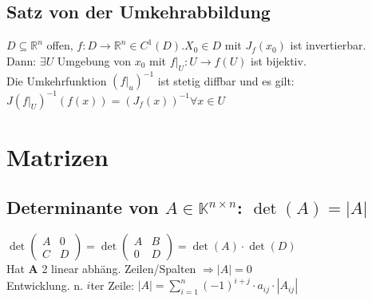 \documentclass[6pt,a4paper]{scrartcl}
\newcommand{\ma}[1]{\ensuremath{\boldsymbol {#1}}}												%
\newcommand{\ra}[0]{\ensuremath{\rightarrow}} 									%
\newcommand{\C}{\ensuremath{\mathbb C}}
\begin{document}
\begin{multicols*}{4}
\subsection{Satz von der Umkehrabbildung}

$D \subseteq \mathbb R^n$ offen, $f: D \ra \mathbb R^n \in C^1 (D). X_0 \in D$ mit $J_f (x_0)$ ist invertierbar. \\
Dann: $\exists U$ Umgebung von $x_0$ mit $f |_U : U \ra f(U)$ ist bijektiv. \\
Die Umkehrfunktion $(f|_u)^{-1}$ ist stetig diffbar und es gilt: \\
$J(f|_U)^{-1} (f(x)) = (J_f (x))^{-1} \forall x \in U$

\section{Matrizen}


\subsection{Determinante von $A\in \mathbb K^{n\times n}$: $\det(A)=|A|$}

$\det\begin{pmatrix}A&0\\C&D\end{pmatrix}=\det\begin{pmatrix}A&B\\0&D\end{pmatrix}=\det(A)\cdot\det(D)$ \\
Hat $\ma A$ 2 linear abhäng. Zeilen/Spalten $\Rightarrow |A|=0$ \\
Entwicklung. n. $i$ter Zeile: $|A|=\sum\limits_{i=1}^n (-1)^{i+j} \cdot a_{ij} \cdot |A_{ij}|$ \qquad 



\end{multicols*}
\end{document}
